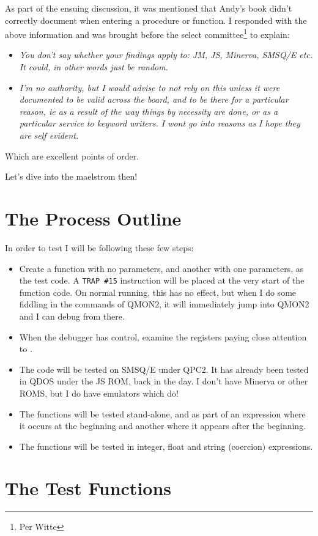 As part of the ensuing discussion, it was mentioned that Andy's book
didn't correctly document  when entering a procedure or function.
I responded with the above information and was brought before the
select committee\footnote{Per Witte} to explain:
\begin{itemize}
\item \emph{You don't say whether your findings apply to: JM, JS, Minerva,
SMSQ/E etc. It could, in other words just be random.}
\item \emph{I'm no authority, but I would advise to not rely on this unless
it were documented to be valid across the board, and to be there for
a particular reason, ie as a result of the way things by necessity
are done, or as a particular service to keyword writers. I wont go
into reasons as I hope they are self evident. }
\end{itemize}
Which are excellent points of order.

Let's dive into the maelstrom then!

\section{The Process Outline}

In order to test I will be following these few steps:
\begin{itemize}
\item Create a function with no parameters, and another with one parameters,
as the test code. A \texttt{TRAP \#15} instruction will be placed
at the very start of the function code. On normal running, this has
no effect, but when I do some fiddling in the commands of QMON2, it
will immediately jump into QMON2 and I can debug from there.
\item When the debugger has control, examine the registers paying close
attention to .
\item The code will be tested on SMSQ/E under QPC2. It has already been
tested in QDOS under the JS ROM, back in the day. I don't have Minerva
or other ROMS, but I do have emulators which do!
\item The functions will be tested stand-alone, and as part of an expression
where it occurs at the beginning and another where it appears after
the beginning.
\item The functions will be tested in integer, float and string (coercion)
expressions.
\end{itemize}

\section{The Test Functions}

